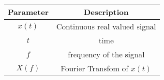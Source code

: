 \renewcommand{\arraystretch}{1.5}
\begin{tabular}{|c|c|}
\hline
Parameter & Description  \\\hline
$x(t)$ & Continuous real valued signal  \\\hline
$t$ & time \\\hline
$f$ & frequency of the signal \\\hline
$X(f)$& Fourier Transfom of $x(t)$\\\hline
\end{tabular}
